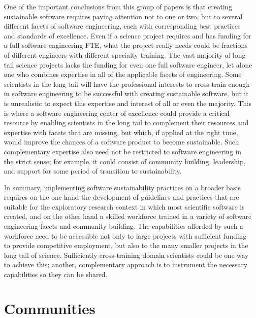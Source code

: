 \documentclass[11pt, oneside]{amsart}
\newcommand{\note}[1]{ {\textcolor{red}    { #1 }}}
\begin{document}
One of the important conclusions from this group of papers is that
creating sustainable software requires paying attention not to one or
two, but to several different facets of software engineering, each
with corresponding best practices and standards of excellence. Even if
a science project requires and has funding for a full software
engineering FTE, what the project really needs could be fractions of
different engineers with different specialty training. The vast
majority of long tail science projects lacks the funding for even one
full software engineer, let alone one who combines expertise in all of
the applicable facets of engineering. Some scientists in the long tail
will have the professional interests to cross-train enough in software
engineering to be successful with creating sustainable software, but
it is unrealistic to expect this expertise and interest of all or even
the majority. This is where a software engineering center of
excellence could provide a critical resource by enabling scientists in
the long tail to complement their resources and expertise with facets
that are missing, but which, if applied at the right time, would
improve the chances of a software product to become sustainable. Such
complementary expertise also need not be restricted to software
engineering in the strict sense; for example, it could consist of
community building, leadership, and support for some period of
transition to sustainability.

In summary, implementing software sustainability practices on a
broader basis requires on the one hand the development of guidelines
and practices that are suitable for the exploratory research context
in which most scientific software is created, and on the other hand a
skilled workforce trained in a variety of software engineering facets
and community building. The capabilities afforded by such a workforce
need to be accessible not only to large projects with sufficient
funding to provide competitive employment, but also to the many
smaller projects in the long tail of science. Sufficiently
cross-training domain scientists could be one way to achieve this;
another, complementary approach is to instrument the necessary
capabilities so they can be shared.

\section{Communities} \label{sec:community}%
\end{document}
